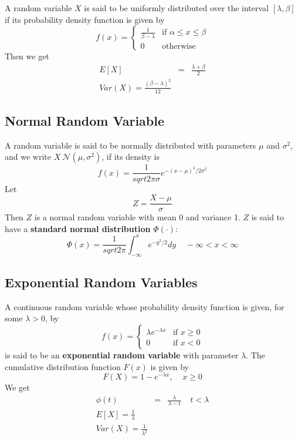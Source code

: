 \documentclass[12pt]{article}
\begin{document}
A random variable $X$ is said to be uniformly distributed over the interval $[\lambda, \beta]$ if its probability density function is given by
\begin{equation*}
  f(x) = 
  \begin{cases}
    \frac{1}{\beta - \lambda} & \text{if } \alpha \le x \le \beta \\
    0 & \text{otherwise}
  \end{cases}
\end{equation*}
Then we get
\begin{eqnarray*}
  E[X] &=& \frac{\lambda + \beta}{2} \\
  Var(X) = \frac{(\beta - \lambda)^2}{12}
\end{eqnarray*}

\subsection{Normal Random Variable}

A random variable is said to be normally distributed with parameters $\mu$ and $\sigma^2$, and we write $X ~ \mathcal{N}(\mu, \sigma^2)$, if its density is
\begin{equation*}
  f(x) = \frac{1}{sqrt{2 \pi \sigma}} e^{-(x-\mu)^2/2\sigma^2}
\end{equation*}
Let
\begin{equation*}
  Z = \frac{X-\mu}{\sigma}
\end{equation*}
Then $Z$ is a normal random variable with mean 0 and variance 1. $Z$ is said to have a \textbf{standard normal distribution} $\Phi(\cdot)$:
\begin{equation*}
  \Phi(x) = \frac{1}{sqrt{2 \pi}} \int_{-\infty}^x e^{-y^2/2} dy
  \;\;\;\; -\infty < x < \infty
\end{equation*}

\subsection{Exponential Random Variables}

A continuous random variable whose probability density function is given, for some $\lambda > 0$, by
\begin{equation*}
  f(x) =
  \begin{cases}
    \lambda e^{-\lambda x} & \text{if } x \ge 0 \\
    0 & \text{if } x < 0
  \end{cases}
\end{equation*}
is said to be an \textbf{exponential random variable} with parameter $\lambda$. The cumulative distribution function $F(x)$ is given by
\begin{equation*}
  F(X) = 1 - e^{-\lambda x}, \;\;\;\; x \ge 0
\end{equation*}
We get
\begin{eqnarray*}
  \phi(t) &=& \frac{\lambda}{\lambda - t} \;\;\;\; t < \lambda \\
  E[X] = \frac{1}{\lambda} \\
  Var(X) = \frac{1}{\lambda^2}
\end{eqnarray*}
\end{document}
